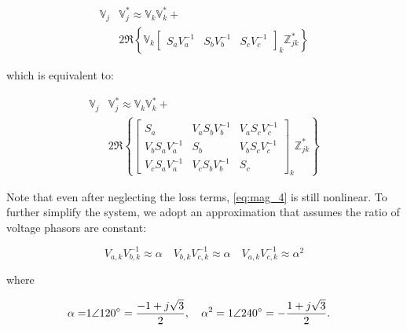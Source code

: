 \begin{equation}
	\begin{aligned}
		\mathbb{V}_{j} & \mathbb{V}_{j}^{*} \approx \mathbb{V}_{k} \mathbb{V}_{k}^{*} + \\
    	& 2 \Re \left\{ \mathbb{V}_{k}
    	\begin{bmatrix}
    		S_{a} V_{a}^{-1} & S_{b} V_{b}^{-1} & S_{c} V_{c}^{-1}
    	\end{bmatrix}_k
    	\mathbb{Z}_{jk}^* \right\}
    \end{aligned}
    \label{eq:mag_3}
\end{equation}

\noindent which is equivalent to:

\begin{equation}
	\begin{aligned}
		\mathbb{V}_{j} & \mathbb{V}_{j}^{*} \approx \mathbb{V}_{k} \mathbb{V}_{k}^{*} + \\
    	& 2 \Re \left\{
    	\begin{bmatrix}
    		S_{a} & V_{a} S_{b} V_{b}^{-1} & V_{a} S_{c} V_{c}^{-1} \\
    		V_{b} S_{a} V_{a}^{-1} & S_{b} & V_{b} S_{c} V_{c}^{-1} \\
    		V_{c} S_{a} V_{a}^{-1} & V_{c} S_{b} V_{b}^{-1} & S_{c}
    	\end{bmatrix}_k
    	\mathbb{Z}_{jk}^* \right\}
    \end{aligned}
    \label{eq:mag_4}
\end{equation}

\setlength{\abovedisplayskip}{-5pt}
\setlength{\belowdisplayskip}{-0pt}

Note that even after neglecting the loss terms, \eqref{eq:mag_4} is still nonlinear.  To further simplify the system, we adopt an approximation that assumes the ratio of voltage phasors are constant:


\begin{equation}
	V_{a,k} V_{b,k}^{-1} \approx \alpha \quad V_{b,k} V_{c,k}^{-1} \approx \alpha \quad V_{a,k} V_{c,k}^{-1} \approx \alpha^{2}
    \label{eq:VaVbVc}
\end{equation}

\noindent where

\begin{align}
	\alpha = &1 \angle 120 \degree = \frac{-1 + j\sqrt{3}}{2}, \quad \alpha^{2} = 1 \angle 240 \degree = -\frac{1 + j\sqrt{3}}{2}.
    \label{eq:alpha}
\end{align}

